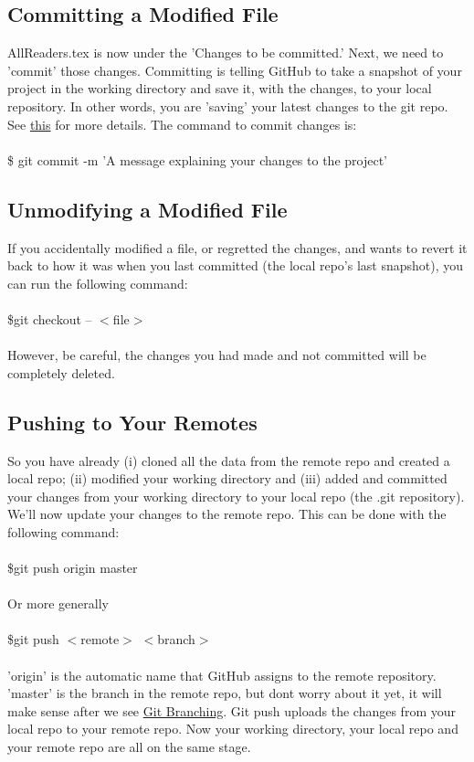 \documentclass[12pt]{article}
\begin{document}
    \subsection{Committing a Modified File}
    AllReaders.tex is now under the 'Changes to be committed.' Next, we need to 'commit' those changes. Committing is telling GitHub to take a snapshot of your project in the working directory and save it, with the changes, to your local repository. In other words, you are 'saving' your latest changes to the git repo.
    See \href{https://git-scm.com/docs/git-commit}{this} for more details. The command to commit changes is:\\
    \\
    \indent \$ git commit -m 'A message explaining your changes to the project'
    \subsection{Unmodifying a Modified File}
    If you accidentally modified a file, or regretted the changes, and wants to revert it back to how it was when you last committed (the local repo's last snapshot), you can run the following command: \\
    \\
    \indent \$git checkout -- $<$file$>$ \\
    \\
    However, be careful, the changes you had made and not committed will be completely deleted.
    \subsection{Pushing to Your Remotes}
    \label{sec:pushing}
    So you have already (i) cloned all the data from the remote repo and created a local repo; (ii) modified your working directory and (iii) added and committed your changes from your working directory to your local repo (the .git repository). We'll now update your changes to the remote repo. This can be done with the following command: \\
    \\
    \indent \$git push origin master \\
    \\
    Or more generally \\
    \\
    \indent \$git push $<$remote$>$ $<$branch$>$ \\
    \\
    'origin' is the automatic name that GitHub assigns to the remote repository. 'master' is the branch in the remote repo, but don\textquotesingle t worry about it yet, it will make sense after we see \hyperref[sec:branching]{Git Branching}. Git push uploads the changes from your local repo to your remote repo. Now your working directory, your local repo and your remote repo are all on the same stage.
\end{document}
